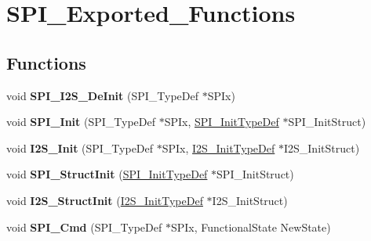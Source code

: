 \hypertarget{group__SPI__Exported__Functions}{
\section{SPI\_\-Exported\_\-Functions}
\label{group__SPI__Exported__Functions}
}
\subsection*{Functions}
\begin{DoxyCompactItemize}
\item 
\hypertarget{group__SPI__Exported__Functions_gabe36880945fa56785283a9c0092124cc}{
void {\bfseries SPI\_\-I2S\_\-DeInit} (SPI\_\-TypeDef $\ast$SPIx)}
\label{group__SPI__Exported__Functions_gabe36880945fa56785283a9c0092124cc}

\item 
\hypertarget{group__SPI__Exported__Functions_ga8dacc1dc48bf08c0f12da409f4889037}{
void {\bfseries SPI\_\-Init} (SPI\_\-TypeDef $\ast$SPIx, \hyperlink{structSPI__InitTypeDef}{SPI\_\-InitTypeDef} $\ast$SPI\_\-InitStruct)}
\label{group__SPI__Exported__Functions_ga8dacc1dc48bf08c0f12da409f4889037}

\item 
\hypertarget{group__SPI__Exported__Functions_ga53661884ae4a9640df7cbc59187782f7}{
void {\bfseries I2S\_\-Init} (SPI\_\-TypeDef $\ast$SPIx, \hyperlink{structI2S__InitTypeDef}{I2S\_\-InitTypeDef} $\ast$I2S\_\-InitStruct)}
\label{group__SPI__Exported__Functions_ga53661884ae4a9640df7cbc59187782f7}

\item 
\hypertarget{group__SPI__Exported__Functions_ga9a0116f88cc2c4478c270f05608703f1}{
void {\bfseries SPI\_\-StructInit} (\hyperlink{structSPI__InitTypeDef}{SPI\_\-InitTypeDef} $\ast$SPI\_\-InitStruct)}
\label{group__SPI__Exported__Functions_ga9a0116f88cc2c4478c270f05608703f1}

\item 
\hypertarget{group__SPI__Exported__Functions_ga7470ec1d0759fdeeb42c7fe71a3b41b7}{
void {\bfseries I2S\_\-StructInit} (\hyperlink{structI2S__InitTypeDef}{I2S\_\-InitTypeDef} $\ast$I2S\_\-InitStruct)}
\label{group__SPI__Exported__Functions_ga7470ec1d0759fdeeb42c7fe71a3b41b7}

\item 
\hypertarget{group__SPI__Exported__Functions_gaa31357879a65ee1ed7223f3b9114dcf3}{
void {\bfseries SPI\_\-Cmd} (SPI\_\-TypeDef $\ast$SPIx, FunctionalState NewState)}
\label{group__SPI__Exported__Functions_gaa31357879a65ee1ed7223f3b9114dcf3}


\end{DoxyCompactItemize}
